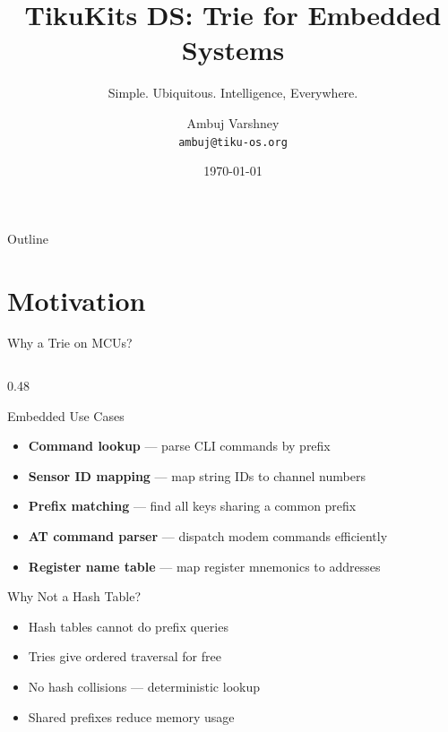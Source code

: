 \documentclass[aspectratio=169, 10pt]{beamer}
\title[TikuKits DS]{TikuKits DS: Trie for Embedded Systems}
\subtitle{Simple. Ubiquitous. Intelligence, Everywhere.}
\author[Ambuj Varshney]{Ambuj Varshney \\ \texttt{ambuj@tiku-os.org}}
\date{\today}
\begin{document}
\begin{frame}
\titlepage
\end{frame}

\begin{frame}{Outline}
\tableofcontents
\end{frame}

\section{Motivation}

\begin{frame}{Why a Trie on MCUs?}
\begin{columns}[T]
\begin{column}{0.48\textwidth}
\begin{block}{Embedded Use Cases}
\begin{itemize}
  \item \textbf{Command lookup} --- parse CLI commands by prefix
  \item \textbf{Sensor ID mapping} --- map string IDs to channel numbers
  \item \textbf{Prefix matching} --- find all keys sharing a common prefix
  \item \textbf{AT command parser} --- dispatch modem commands efficiently
  \item \textbf{Register name table} --- map register mnemonics to addresses
\end{itemize}
\end{block}

\begin{block}{Why Not a Hash Table?}
\begin{itemize}
  \item Hash tables cannot do prefix queries
  \item Tries give ordered traversal for free
  \item No hash collisions --- deterministic lookup
  \item Shared prefixes reduce memory usage
\end{itemize}
\end{block}
\end{column}


\end{columns}
\end{frame}
\end{document}
